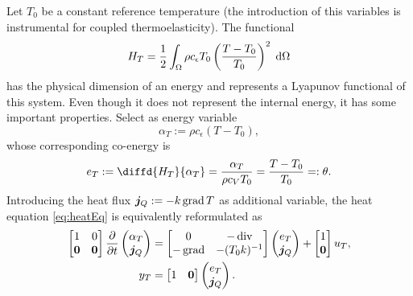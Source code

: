 Let $T_0$ be a constant reference temperature (the introduction of this variables is instrumental for coupled thermoelasticity). The functional 
\begin{equation*}
	H_T = \frac{1}{2} \int_\Omega \rho c_\epsilon T_0 \left(\frac{T-T_0}{T_0} \right)^2 \d\Omega
\end{equation*} 
has the physical dimension of an energy and represents a Lyapunov functional of this system. Even though it does not represent the internal energy, it has some important properties. Select as energy variable 
\begin{equation*}
\alpha_T := \rho c_\epsilon (T-T_0),
\end{equation*}
whose corresponding co-energy is 
\begin{equation*}
	e_T := \diffd{H_T}{\alpha_T} = \frac{\alpha_T}{\rho c_V T_0} = \frac{T-T_0}{T_0} =: \theta.
\end{equation*}
Introducing the heat flux $\bm{j}_Q := -k \operatorname*{grad} T$ as additional variable, the heat equation \eqref{eq:heatEq} is equivalently reformulated as
\begin{equation}\label{eq:phsysHeat}
\begin{aligned}
\begin{bmatrix}
1 & 0 \\
\bm{0} & \bm{0} \\
\end{bmatrix}
\diffp{}{t}
\begin{pmatrix}
\alpha_T \\
\bm{j}_Q \\
\end{pmatrix} &= 
\begin{bmatrix}
0 & -\div \\
-\grad & -(T_0 k)^{-1} \\
\end{bmatrix}
\begin{pmatrix}
e_T \\
\bm{j}_Q \\
\end{pmatrix} + 
\begin{bmatrix}
1 \\
\bm{0} \\
\end{bmatrix} u_T, \\
y_T &= \begin{bmatrix}
1 & \bm{0} \\
\end{bmatrix} \begin{pmatrix}
e_T \\
\bm{j}_Q \\
\end{pmatrix}.
\end{aligned}
\end{equation}
